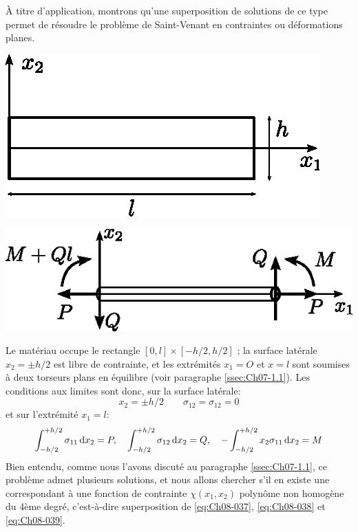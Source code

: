 À titre d'application, montrons qu'une superposition de solutions de ce type permet de résoudre le problème de Saint-Venant en contraintes ou déformations planes. 
\begin{multicols}{2}
    \begin{center}
        \includegraphics{../images/T1_Ch08-02a}
    \end{center}
    \columnbreak
    \begin{center}
        \includegraphics{../images/T1_Ch08-02b}
    \end{center}
\end{multicols}
Le matériau occupe le rectangle $\left[0,l\right] \times\left [-h/2,h/2\right]$ ; la surface latérale $x_2=\pm h/2$ est libre de contrainte, et les extrémités $x_1=O$ et $x = l$ sont soumises à deux torseurs plans en équilibre (voir paragraphe \ref{ssec:Ch07-1.1}). 
Les conditions aux limites sont donc, sur la surface latérale: 
\begin{equation}
  x_2 = \pm h/2 \qquad \sigma_{12} = \sigma_{12} = 0
    \label{eq:Ch08-040}
\end{equation}
et sur l'extrémité $x_1 = l$: 
\begin{equation}
     \int^{+h/2}_{-h/2}     \sigma_{11} \mathop{\mathrm{{}d}}\mathopen{} x_2  = P,\quad
     \int^{+h/2}_{-h/2}     \sigma_{12} \mathop{\mathrm{{}d}}\mathopen{} x_2  = Q,\quad
    -\int^{+h/2}_{-h/2} x_2 \sigma_{11} \mathop{\mathrm{{}d}}\mathopen{} x_2  = M
    \label{eq:Ch08-041}
\end{equation}
Bien entendu, comme nous l'avons discuté au paragraphe \ref{ssec:Ch07-1.1}, ce problème admet plusieurs solutions, et nous allons chercher s'il en existe une correspondant à une fonction de contrainte $\chi(x_1,x_2)$ polynôme non homogène du 4ème degré, c'est-à-dire superposition de \eqref{eq:Ch08-037}, \eqref{eq:Ch08-038} et \eqref{eq:Ch08-039}.

